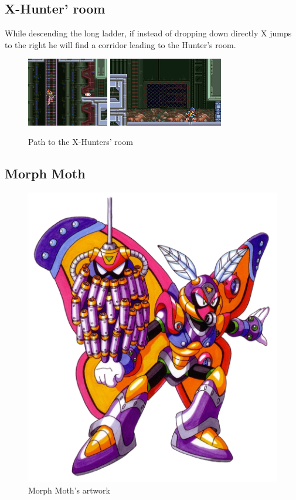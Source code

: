 \subsection{X-Hunter' room}
While descending  the long ladder, if instead of dropping down directly X jumps to the right he will find a corridor leading to the Hunter's room.
\begin{figure}[htp]
	\centering
	\includegraphics[height=3cm]{figures/X2/Morph_moth/Moth_hunter_entrance.jpg}
	\includegraphics[height=3cm]{figures/X2/Morph_moth/Moth_hunter_room.jpg}
	\caption{Path to the X-Hunters' room}
\end{figure}


\subsection{Morph Moth}\label{boss:Morph_moth}
\begin{figure}[htp]
	\centering
	\includegraphics[height=\portraitsize]{figures/X2/Morph_moth/Morph_Moth.png}
	\caption{Morph Moth's artwork~\cite{book:MMX_Complete_art}}
\end{figure}


